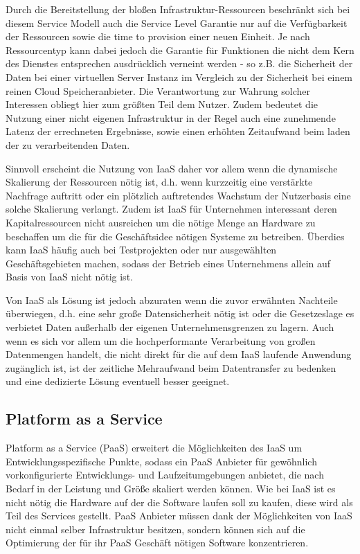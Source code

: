 \documentclass[journal]{IEEEtran}
\begin{document}
Durch die Bereitstellung der bloßen Infrastruktur-Ressourcen beschränkt sich bei diesem Service Modell auch die Service Level Garantie nur auf die Verfügbarkeit der Ressourcen sowie die time to provision einer neuen Einheit. Je nach Ressourcentyp kann dabei jedoch die Garantie für Funktionen die nicht dem Kern des Dienstes entsprechen ausdrücklich verneint werden - so z.B. die Sicherheit der Daten bei einer virtuellen Server Instanz im Vergleich zu der Sicherheit bei einem reinen Cloud Speicheranbieter. Die Verantwortung zur Wahrung solcher Interessen obliegt hier zum größten Teil dem Nutzer. Zudem bedeutet die Nutzung einer nicht eigenen Infrastruktur in der Regel auch eine zunehmende Latenz der errechneten Ergebnisse, sowie einen erhöhten Zeitaufwand beim laden der zu verarbeitenden Daten.

Sinnvoll erscheint die Nutzung von IaaS daher vor allem wenn die dynamische Skalierung der Ressourcen nötig ist, d.h. wenn kurzzeitig eine verstärkte Nachfrage auftritt oder ein plötzlich auftretendes Wachstum der Nutzerbasis eine solche Skalierung verlangt. Zudem ist IaaS für Unternehmen interessant deren Kapitalressourcen nicht ausreichen um die nötige Menge an Hardware zu beschaffen um die für die Geschäftsidee nötigen Systeme zu betreiben. Überdies kann IaaS häufig auch bei Testprojekten oder nur ausgewählten Geschäftsgebieten machen, sodass der Betrieb eines Unternehmens allein auf Basis von IaaS nicht nötig ist.

Von IaaS als Lösung ist jedoch abzuraten wenn die zuvor erwähnten Nachteile überwiegen, d.h. eine sehr große Datensicherheit nötig ist oder die Gesetzeslage es verbietet Daten außerhalb der eigenen Unternehmensgrenzen zu lagern. Auch wenn es sich vor allem um die hochperformante Verarbeitung von großen Datenmengen handelt, die nicht direkt für die auf dem IaaS laufende Anwendung zugänglich ist, ist der zeitliche Mehraufwand beim Datentransfer zu bedenken und eine dedizierte Lösung eventuell besser geeignet. 

\subsection{Platform as a Service}
Platform as a Service (PaaS) erweitert die Möglichkeiten des IaaS um Entwicklungsspezifische Punkte, sodass ein PaaS Anbieter für gewöhnlich vorkonfigurierte Entwicklungs- und Laufzeitumgebungen anbietet, die nach Bedarf in der Leistung und Größe skaliert werden können. Wie bei IaaS ist es nicht nötig die Hardware auf der die Software laufen soll zu kaufen, diese wird als Teil des Services gestellt. PaaS Anbieter müssen dank der Möglichkeiten von IaaS nicht einmal selber Infrastruktur besitzen, sondern können sich auf die Optimierung der für ihr PaaS Geschäft nötigen Software konzentrieren. 
\end{document}
